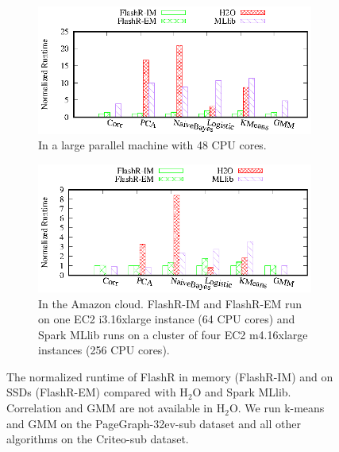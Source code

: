 \begin{figure}
  \vspace{-5pt}
	\centering
	\footnotesize
	\begin{subfigure}{.5\textwidth}
		\includegraphics{FlashMatrix_figs/FlashR-vs-dist.eps}
		\caption{In a large parallel machine with 48 CPU cores.}
		\label{perf:para}
	\end{subfigure}

	\vspace{3pt}
	\begin{subfigure}{.5\textwidth}
		\includegraphics{FlashMatrix_figs/FlashR-vs-dist-EC2.eps}
		\caption{In the Amazon cloud. FlashR-IM and FlashR-EM run on one
			EC2 i3.16xlarge instance (64 CPU cores) and Spark MLlib runs
		on a cluster of four EC2 m4.16xlarge instances (256 CPU cores).}
		\label{perf:cloud}
	\end{subfigure}
	\vspace{-8pt}
	\caption{The normalized runtime of FlashR in memory (FlashR-IM) and
	on SSDs (FlashR-EM) compared with H$_2$O and Spark MLlib. Correlation and GMM
	are not available in H$_2$O. We run k-means and GMM on the PageGraph-32ev-sub
	dataset and all other algorithms on the Criteo-sub dataset.}
	\label{perf:rt}
  \vspace{-10pt}
\end{figure}

